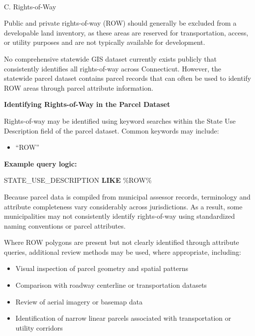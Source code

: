 \documentclass[
  letterpaper,
  DIV=11,
  numbers=noendperiod]{scrreprt}
\makeatletter
\let\oldparagraph\paragraph
\renewcommand{\paragraph}{
    \@ifstar
      \xxxParagraphStar
      \xxxParagraphNoStar
  }
\newcommand{\xxxParagraphStar}[1]{\oldparagraph*{#1}\mbox{}}
\newcommand{\xxxParagraphNoStar}[1]{\oldparagraph{#1}\mbox{}}
\newenvironment{Shaded}{\begin{snugshade}}{\end{snugshade}}
\newcommand{\KeywordTok}[1]{\textcolor[rgb]{0.00,0.23,0.31}{\textbf{#1}}}
\newcommand{\NormalTok}[1]{\textcolor[rgb]{0.00,0.23,0.31}{#1}}
\newcommand{\StringTok}[1]{\textcolor[rgb]{0.13,0.47,0.30}{#1}}
\providecommand{\tightlist}{%
  \setlength{\itemsep}{0pt}\setlength{\parskip}{0pt}}
\makeatother
\begin{document}
\paragraph{C. Rights-of-Way}\label{c.-rights-of-way}

Public and private rights-of-way (ROW) should generally be excluded from
a developable land inventory, as these areas are reserved for
transportation, access, or utility purposes and are not typically
available for development.

No comprehensive statewide GIS dataset currently exists publicly that
consistently identifies all rights-of-way across Connecticut. However,
the statewide parcel dataset contains parcel records that can often be
used to identify ROW areas through parcel attribute information.

\textbf{Identifying Rights-of-Way in the Parcel Dataset}

Rights-of-way may be identified using keyword searches within the State
Use Description field of the parcel dataset. Common keywords may
include:

\begin{itemize}
\tightlist
\item
  ``ROW''
\end{itemize}

\textbf{Example query logic:}

\begin{Shaded}
\begin{Highlighting}[]
\NormalTok{STATE\_USE\_DESCRIPTION }\KeywordTok{LIKE} \StringTok{\textquotesingle{}\%ROW\%\textquotesingle{}}
\end{Highlighting}
\end{Shaded}

Because parcel data is compiled from municipal assessor records,
terminology and attribute completeness vary considerably across
jurisdictions. As a result, some municipalities may not consistently
identify rights-of-way using standardized naming conventions or parcel
attributes.

Where ROW polygons are present but not clearly identified through
attribute queries, additional review methods may be used, where
appropriate, including:

\begin{itemize}
\tightlist
\item
  Visual inspection of parcel geometry and spatial patterns
\item
  Comparison with roadway centerline or transportation datasets
\item
  Review of aerial imagery or basemap data
\item
  Identification of narrow linear parcels associated with transportation
  or utility corridors
\end{itemize}
\end{document}
